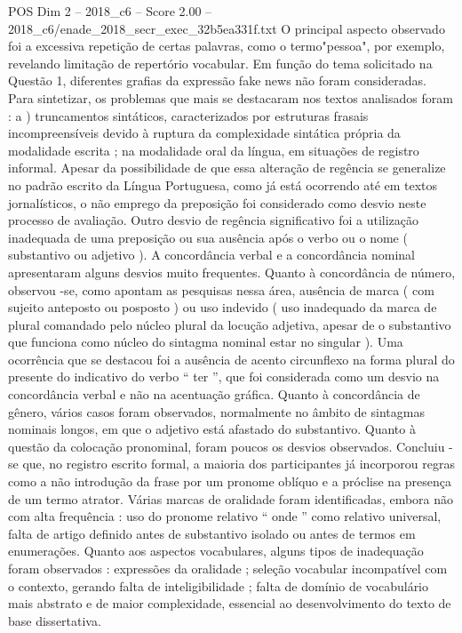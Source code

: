 \begin{textsample}{POS Dim 2 – 2018\_c6 – Score 2.00 – 2018\_c6/enade\_2018\_secr\_exec\_32b5ea331f.txt}
O principal aspecto observado foi a excessiva repetição de certas palavras, como o termo"pessoa", por exemplo, revelando limitação de repertório vocabular.
Em função do tema solicitado na Questão 1, diferentes grafias da expressão fake news não foram consideradas.
Para sintetizar, os problemas que mais se destacaram nos textos analisados foram : a ) truncamentos sintáticos, caracterizados por estruturas frasais incompreensíveis devido à ruptura da complexidade sintática própria da modalidade escrita ; na modalidade oral da língua, em situações de registro informal.
Apesar da possibilidade de que essa alteração de regência se generalize no padrão escrito da Língua Portuguesa, como já está ocorrendo até em textos jornalísticos, o não emprego da preposição foi considerado como desvio neste processo de avaliação.
Outro desvio de regência significativo foi a utilização inadequada de uma preposição ou sua ausência após o verbo ou o nome ( substantivo ou adjetivo ).
A concordância verbal e a concordância nominal apresentaram alguns desvios muito frequentes.
Quanto à concordância de número, observou -se, como apontam as pesquisas nessa área, ausência de marca ( com sujeito anteposto ou posposto ) ou uso indevido ( uso inadequado da marca de plural comandado pelo núcleo plural da locução adjetiva, apesar de o substantivo que funciona como núcleo do sintagma nominal estar no singular ).
Uma ocorrência que se destacou foi a ausência de acento circunflexo na forma plural do presente do indicativo do verbo “ ter ”, que foi considerada como um desvio na concordância verbal e não na acentuação gráfica.
Quanto à concordância de gênero, vários casos foram observados, normalmente no âmbito de sintagmas nominais longos, em que o adjetivo está afastado do substantivo.
Quanto à questão da colocação pronominal, foram poucos os desvios observados.
Concluiu -se que, no registro escrito formal, a maioria dos participantes já incorporou regras como a não introdução da frase por um pronome oblíquo e a próclise na presença de um termo atrator.
Várias marcas de oralidade foram identificadas, embora não com alta frequência : uso do pronome relativo “ onde ” como relativo universal, falta de artigo definido antes de substantivo isolado ou antes de termos em enumerações.
Quanto aos aspectos vocabulares, alguns tipos de inadequação foram observados : expressões da oralidade ; seleção vocabular incompatível com o contexto, gerando falta de inteligibilidade ; falta de domínio de vocabulário mais abstrato e de maior complexidade, essencial ao desenvolvimento do texto de base dissertativa.

\end{textsample}
